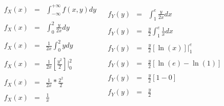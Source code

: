 \documentclass[12pt]{article}
\begin{document}
    \begin{equation*}
        \begin{array}{c|c}
		    \begin{array}{rcl}
                f_{X}(x) & = &  \displaystyle\int_{-\infty}^{+\infty} f\left(x,y\right) dy
                \\
                \\
                f_{X}(x) & = &  \displaystyle\int_{0}^{2} \frac{y}{2x}dy
                \\
                \\
                f_{X}(x) & = &  \displaystyle\frac{1}{2x}\int_{0}^{2}ydy
                \\
                \\
                f_{X}(x) & = &  \displaystyle\frac{1}{2x}\left[\frac{y^2}{2}\right]\vert_{0}^{2}
                \\
                \\
                f_{X}(x) & = &\displaystyle\frac{1}{2x}* \frac{2^2}{2}
                \\
                \\
                f_{X}(x) & = &  \displaystyle \frac{1}{x}
		    \end{array}
		    &
	        \begin{array}{rcl}
                f_{Y}(y) & = &  \displaystyle\int_{1}^{e}\frac{y}{2x} dx
                \\
                \\
                f_{Y}(y) & = &  \displaystyle\frac{y}{2} \int_{1}^{e}\frac{1}{x}dx
                \\
                \\
                f_{Y}(y) & = &  \displaystyle\frac{y}{2} \left[\ln(x)\right]\vert_{1}^{e}
                \\
                \\
                f_{Y}(y) & = &   \displaystyle\frac{y}{2} \left[\ln(e) - \ln(1)\right]
                \\
                \\
                f_{Y}(y) & = &  \displaystyle\frac{y}{2} \left[1-0\right]
                \\
                \\
                f_{Y}(y) & = &  \displaystyle\frac{y}{2}
	       \end{array}
        \end{array}
    \end{equation*}
\end{document}

